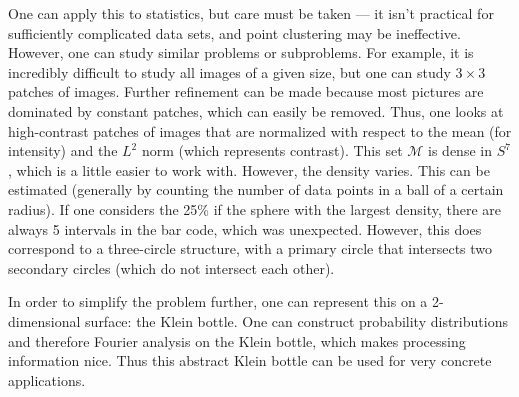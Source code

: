 One can apply this to statistics, but care must be taken --- it isn't practical for sufficiently complicated data sets, and point clustering may be ineffective. However, one can study similar problems or subproblems. For example, it is incredibly difficult to study all images of a given size, but one can study $3\times 3$ patches of images. Further refinement can be made because most pictures are dominated by constant patches, which can easily be removed. Thus, one looks at high-contrast patches of images that are normalized with respect to the mean (for intensity) and the $L^2$ norm (which represents contrast). This set $\mathcal M$ is dense in $S^7$, which is a little easier to work with. However, the density varies. This can be estimated (generally by counting the number of data points in a ball of a certain radius). If one considers the 25\% if the sphere with the largest density, there are always 5 intervals in the bar code, which was unexpected. However, this does correspond to a three-circle structure, with a primary circle that intersects two secondary circles (which do not intersect each other).

In order to simplify the problem further, one can represent this on a 2-dimensional surface: the Klein bottle. One can construct probability distributions and therefore Fourier analysis on the Klein bottle, which makes processing information nice. Thus this abstract Klein bottle can be used for very concrete applications.
